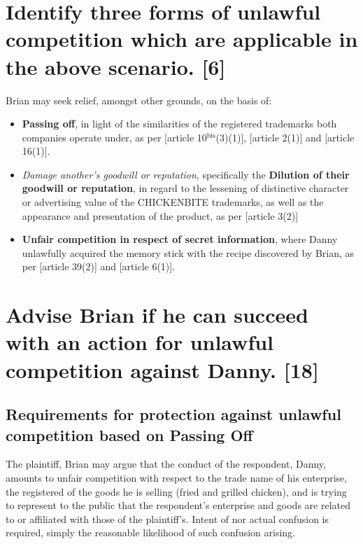 \documentclass[11pt]{article}
\begin{document}
\section{Identify three forms of unlawful competition which are applicable in the above scenario. [6]}
\label{sec:orgde4307c}
Brian may seek relief, amongst other grounds, on the basis of:
\begin{itemize}
\item \textbf{Passing off}, in light of the similarities of the registered trademarks both companies operate under, as per [article
10\(^{\text{bis}}\)(3)(1)]\cite{wipo83_paris_conve_protect_ip}, [article
2(1)]\cite{wipo96_model_provi_unfair_comp} and [article 16(1)]\cite{wto17_trips}.
\item \emph{Damage another's goodwill or reputation}, specifically the \textbf{Dilution of their
goodwill or reputation}, in regard to the lessening of distinctive character
or advertising value of the CHICKENBITE trademarks, as well as the appearance and
presentation of the product, as per [article 3(2)]\cite{wipo96_model_provi_unfair_comp}
\item \textbf{Unfair competition in respect of secret information}, where Danny unlawfully
acquired the memory stick with the recipe discovered by Brian, as per
[article 39(2)]\cite{wto17_trips} and [article 6(1)]\cite{wipo96_model_provi_unfair_comp}.
\end{itemize}

\section{Advise Brian if he can succeed with an action for unlawful competition against Danny. [18]}
\label{sec:org37e8747}
\subsection{Requirements for protection against unlawful competition based on Passing Off}
\label{sec:orgc611a82}
The plaintiff, Brian may argue that the conduct of the respondent, Danny,
amounts to unfair competition with respect to the trade name of his enterprise,
the registered of the goods he is selling (fried and grilled chicken), and is
trying to represent to the public that the respondent's enterprise and goods are
related to or affiliated with those of the plaintiff's. Intent of nor actual
confusion is required, simply the reasonable likelihood of such confusion
arising.\\
\end{document}
